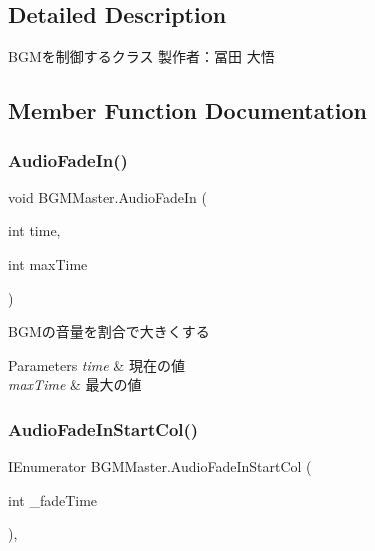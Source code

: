 \subsection{Detailed Description}
B\+G\+Mを制御するクラス 製作者：冨田 大悟 



\subsection{Member Function Documentation}
\mbox{\label{class_b_g_m_master_a4b2315419cfa6ea99960e554e195f209}} 
\subsubsection{\texorpdfstring{Audio\+Fade\+In()}{AudioFadeIn()}}
{\footnotesize\ttfamily void B\+G\+M\+Master.\+Audio\+Fade\+In (\begin{DoxyParamCaption}\item[{int}]{time,  }\item[{int}]{max\+Time }\end{DoxyParamCaption})\hspace{0.3cm}{\ttfamily [inline]}}



B\+G\+Mの音量を割合で大きくする 


\begin{DoxyParams}{Parameters}
{\em time} & 現在の値\\
\hline
{\em max\+Time} & 最大の値\\
\hline
\end{DoxyParams}
\mbox{\label{class_b_g_m_master_a3666e5162008d1b647d6533a7a1c420d}} 
\subsubsection{\texorpdfstring{Audio\+Fade\+In\+Start\+Col()}{AudioFadeInStartCol()}}
{\footnotesize\ttfamily I\+Enumerator B\+G\+M\+Master.\+Audio\+Fade\+In\+Start\+Col (\begin{DoxyParamCaption}\item[{int}]{\+\_\+fade\+Time }\end{DoxyParamCaption})\hspace{0.3cm}{\ttfamily [inline]}, {\ttfamily [private]}}



